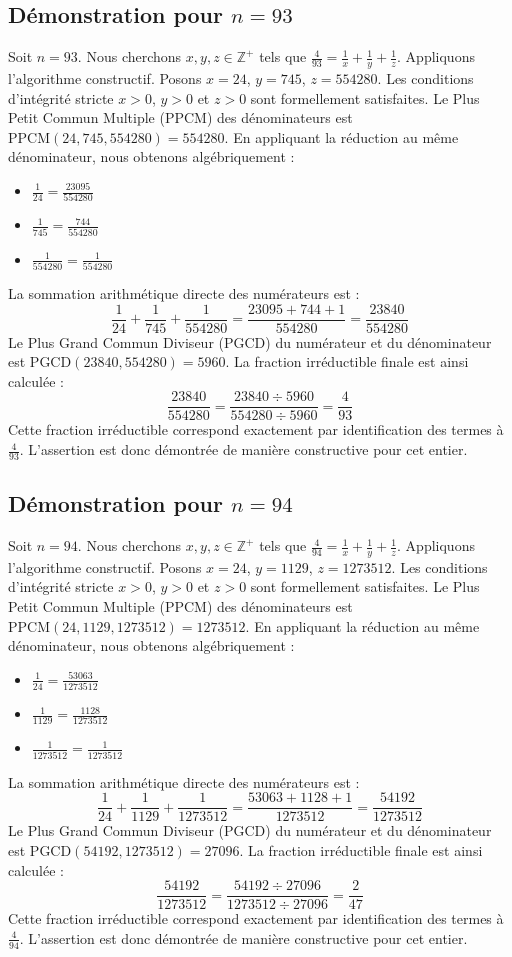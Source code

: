 \documentclass[11pt,a4paper]{article}
\begin{document}
\subsection{Démonstration pour $n = 93$}
Soit $n = 93$. Nous cherchons $x, y, z \in \mathbb{Z}^{+}$ tels que $\frac{4}{93} = \frac{1}{x} + \frac{1}{y} + \frac{1}{z}$.
Appliquons l'algorithme constructif. Posons $x = 24$, $y = 745$, $z = 554280$.
Les conditions d'intégrité stricte $x > 0$, $y > 0$ et $z > 0$ sont formellement satisfaites.
Le Plus Petit Commun Multiple (PPCM) des dénominateurs est $\text{PPCM}(24, 745, 554280) = 554280$.
En appliquant la réduction au même dénominateur, nous obtenons algébriquement :
\begin{itemize}
    \item $\frac{1}{24} = \frac{23095}{554280}$
    \item $\frac{1}{745} = \frac{744}{554280}$
    \item $\frac{1}{554280} = \frac{1}{554280}$
\end{itemize}
La sommation arithmétique directe des numérateurs est :
$$ \frac{1}{24} + \frac{1}{745} + \frac{1}{554280} = \frac{23095 + 744 + 1}{554280} = \frac{23840}{554280} $$
Le Plus Grand Commun Diviseur (PGCD) du numérateur et du dénominateur est $\text{PGCD}(23840, 554280) = 5960$.
La fraction irréductible finale est ainsi calculée :
$$ \frac{23840}{554280} = \frac{23840 \div 5960}{554280 \div 5960} = \frac{4}{93} $$
Cette fraction irréductible correspond exactement par identification des termes à $\frac{4}{93}$. L'assertion est donc démontrée de manière constructive pour cet entier.

\subsection{Démonstration pour $n = 94$}
Soit $n = 94$. Nous cherchons $x, y, z \in \mathbb{Z}^{+}$ tels que $\frac{4}{94} = \frac{1}{x} + \frac{1}{y} + \frac{1}{z}$.
Appliquons l'algorithme constructif. Posons $x = 24$, $y = 1129$, $z = 1273512$.
Les conditions d'intégrité stricte $x > 0$, $y > 0$ et $z > 0$ sont formellement satisfaites.
Le Plus Petit Commun Multiple (PPCM) des dénominateurs est $\text{PPCM}(24, 1129, 1273512) = 1273512$.
En appliquant la réduction au même dénominateur, nous obtenons algébriquement :
\begin{itemize}
    \item $\frac{1}{24} = \frac{53063}{1273512}$
    \item $\frac{1}{1129} = \frac{1128}{1273512}$
    \item $\frac{1}{1273512} = \frac{1}{1273512}$
\end{itemize}
La sommation arithmétique directe des numérateurs est :
$$ \frac{1}{24} + \frac{1}{1129} + \frac{1}{1273512} = \frac{53063 + 1128 + 1}{1273512} = \frac{54192}{1273512} $$
Le Plus Grand Commun Diviseur (PGCD) du numérateur et du dénominateur est $\text{PGCD}(54192, 1273512) = 27096$.
La fraction irréductible finale est ainsi calculée :
$$ \frac{54192}{1273512} = \frac{54192 \div 27096}{1273512 \div 27096} = \frac{2}{47} $$
Cette fraction irréductible correspond exactement par identification des termes à $\frac{4}{94}$. L'assertion est donc démontrée de manière constructive pour cet entier.
\end{document}
